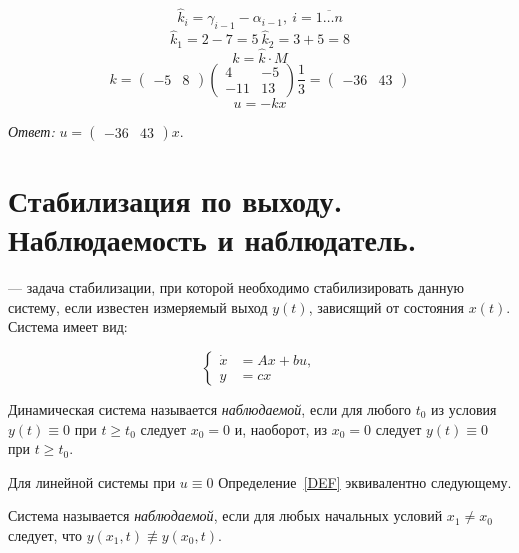 \documentclass[../../TAU.tex]{subfiles}
\begin{document}
    $$
        \widehat k_i=\gamma    _{i-1}-\alpha_{i-1},\ i=\overline{1\dots n}
    $$
    $$
        \widehat k_1 = 2-7=5\ \widehat k_2 =3+5=8
    $$
    $$
        k=\widehat k\cdot M
    $$
    $$
        k=
        \begin{pmatrix}
        -5 & 8
        \end{pmatrix}
        \begin{pmatrix}
            4 & -5\\
            -11 & 13
        \end{pmatrix}
        \frac{1}{3}
        =
        \begin{pmatrix}
            -36 & 43
        \end{pmatrix}
    $$
    $$
        u = -kx
    $$

    \textit{Ответ: }
    $
        u=
        \begin{pmatrix}
            -36 & 43
        \end{pmatrix}
        x.
    $

\section{Стабилизация по выходу. Наблюдаемость и наблюдатель.}

     --- задача стабилизации, при которой необходимо стабилизировать данную систему, если известен измеряемый выход $y(t)$, зависящий от состояния $x(t)$. Система имеет вид:

    \begin{equation}\label{DS}
        \left\{
        \begin{aligned}
            \dot x &= Ax + bu,\\
            y &= c x
        \end{aligned}
        \right.
    \end{equation}

    \begin{defi}\label{DEF}
        Динамическая система  называется \textit{наблюдаемой}, если для любого $t_0$ из условия $y(t)\equiv 0$ при $t\ge t_0$ следует $x_0 = 0$ и, наоборот, из $x_0=0$ следует $y(t)\equiv0$ при $t\ge t_0$.
    \end{defi}

    Для линейной системы  при $u\equiv0$ Определение~\ref{DEF} эквивалентно следующему.
    
    \begin{defi}
        Система  называется \textit{наблюдаемой}, если для любых начальных условий $x_1\neq x_0$ следует, что $y(x_1, t)\not\equiv y(x_0, t)$.
    \end{defi}
\end{document}
